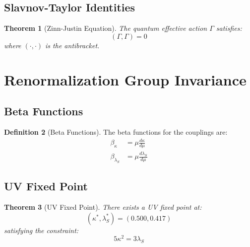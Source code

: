 \documentclass[11pt,a4paper]{article}
\theoremstyle{plain}
\newtheorem{theorem}{Theorem}[section]
\theoremstyle{definition}
\newtheorem{definition}[theorem]{Definition}
\begin{document}
\subsection{Slavnov-Taylor Identities}

\begin{theorem}[Zinn-Justin Equation]
\label{thm:zinn_justin}
The quantum effective action $\Gamma$ satisfies:
\begin{equation}
(\Gamma, \Gamma) = 0
\label{eq:zinn_justin}
\end{equation}
where $(\cdot,\cdot)$ is the antibracket.
\end{theorem}

\section{Renormalization Group Invariance}
\label{sec:rg}

\subsection{Beta Functions}

\begin{definition}[Beta Functions]
The beta functions for the couplings are:
\begin{align}
\beta_\kappa &= \mu\frac{d\kappa}{d\mu} \\
\beta_{\lambda_S} &= \mu\frac{d\lambda_S}{d\mu}
\end{align}
\end{definition}

\subsection{UV Fixed Point}

\begin{theorem}[UV Fixed Point]
\label{thm:fixed_point}
There exists a UV fixed point at:
\begin{equation}
(\kappa^*, \lambda_S^*) = (0.500, 0.417)
\label{eq:fixed_point}
\end{equation}
satisfying the constraint:
\begin{equation}
5\kappa^2 = 3\lambda_S
\label{eq:fixed_point_condition}
\end{equation}
\end{theorem}
\end{document}
